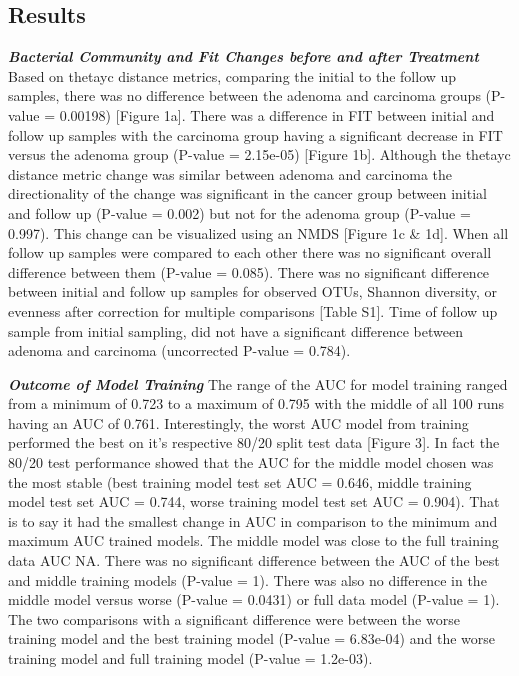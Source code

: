 \documentclass[12pt,]{article}
\begin{document}
\newpage

\subsection{Results}\label{results}

\textbf{\emph{Bacterial Community and Fit Changes before and after
Treatment}} Based on thetayc distance metrics, comparing the initial to
the follow up samples, there was no difference between the adenoma and
carcinoma groups (P-value = 0.00198) {[}Figure 1a{]}. There was a
difference in FIT between initial and follow up samples with the
carcinoma group having a significant decrease in FIT versus the adenoma
group (P-value = 2.15e-05) {[}Figure 1b{]}. Although the thetayc
distance metric change was similar between adenoma and carcinoma the
directionality of the change was significant in the cancer group between
initial and follow up (P-value = 0.002) but not for the adenoma group
(P-value = 0.997). This change can be visualized using an NMDS {[}Figure
1c \& 1d{]}. When all follow up samples were compared to each other
there was no significant overall difference between them (P-value =
0.085). There was no significant difference between initial and follow
up samples for observed OTUs, Shannon diversity, or evenness after
correction for multiple comparisons {[}Table S1{]}. Time of follow up
sample from initial sampling, did not have a significant difference
between adenoma and carcinoma (uncorrected P-value = 0.784).

\textbf{\emph{Outcome of Model Training}} The range of the AUC for model
training ranged from a minimum of 0.723 to a maximum of 0.795 with the
middle of all 100 runs having an AUC of 0.761. Interestingly, the worst
AUC model from training performed the best on it's respective 80/20
split test data {[}Figure 3{]}. In fact the 80/20 test performance
showed that the AUC for the middle model chosen was the most stable
(best training model test set AUC = 0.646, middle training model test
set AUC = 0.744, worse training model test set AUC = 0.904). That is to
say it had the smallest change in AUC in comparison to the minimum and
maximum AUC trained models. The middle model was close to the full
training data AUC NA. There was no significant difference between the
AUC of the best and middle training models (P-value = 1). There was also
no difference in the middle model versus worse (P-value = 0.0431) or
full data model (P-value = 1). The two comparisons with a significant
difference were between the worse training model and the best training
model (P-value = 6.83e-04) and the worse training model and full
training model (P-value = 1.2e-03).
\end{document}
